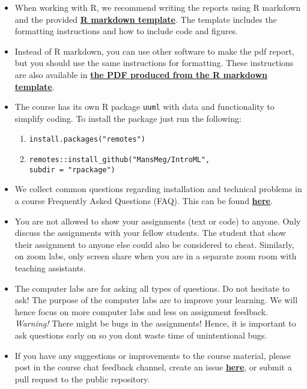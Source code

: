 \begin{itemize}
\item When working with R, we recommend writing the reports using R markdown and the provided \href{https://raw.githubusercontent.com/MansMeg/IntroML/master/templates/assignment_template.rmd}{\textbf{R markdown template}}. The template includes the formatting instructions and how to include code and figures.

\item Instead of R markdown, you can use other software to make the pdf report, but you should use the same instructions for formatting. These instructions are also available in \href{https://raw.githubusercontent.com/MansMeg/IntroML/master/templates/assignment_template.pdf}{\textbf{the PDF produced from the R markdown template}}.

\item The course has its own R package \texttt{uuml} with data and functionality to simplify coding. To install the package just run the following:
\begin{enumerate}
\item \texttt{install.packages("remotes")}
\item \texttt{remotes::install\_github("MansMeg/IntroML", \\ subdir = "rpackage")}
\end{enumerate}


\item We collect common questions regarding installation and technical problems in a course Frequently Asked Questions (FAQ). This can be found \href{https://github.com/MansMeg/IntroML/blob/master/FAQ.md}{\textbf{here}}.

\item You are not allowed to show your assignments (text or code) to anyone. Only discuss the assignments with your fellow students. The student that show their assignment to anyone else could also be considered to cheat. Similarly, on zoom labs, only screen share when you are in a separate zoom room with teaching assistants.

\item The computer labs are for asking all types of questions. Do not hesitate to ask! The purpose of the computer labs are to improve your learning. We will hence focus on more computer labs and less on assignment feedback. \emph{Warning!} There might be bugs in the assignments! Hence, it is important to ask questions early on so you dont waste time of unintentional bugs.

\item If you have any suggestions or improvements to the course material, please post in the course chat feedback channel, create an issue \href{https://github.com/MansMeg/IntroML/issues}{\textbf{here}}, or submit a pull request to the public repository.

\end{itemize}

